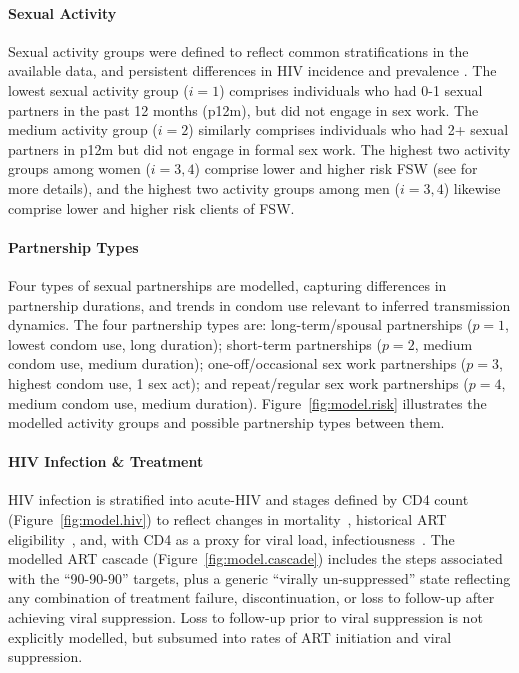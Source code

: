 \paragraph{Sexual Activity}
Sexual activity groups were defined to reflect common stratifications in the available data,
and persistent differences in HIV incidence and prevalence
\cite{SDHS2006,Bicego2013,Justman2016,SHIMS2}.
The lowest sexual activity group ($i=1$) comprises
individuals who had 0-1 sexual partners in the past 12 months (p12m),
but did not engage in sex work.
The medium activity group ($i=2$) similarly comprises
individuals who had 2+ sexual partners in p12m
but did not engage in formal sex work.
The highest two activity groups among women ($i=3,4$) comprise
lower and higher risk FSW (see  for more details), and
the highest two activity groups among men ($i=3,4$) likewise comprise
lower and higher risk clients of FSW.
\paragraph{Partnership Types}
Four types of sexual partnerships are modelled,
capturing differences in partnership durations, and
trends in condom use relevant to inferred transmission dynamics.
The four partnership types are:
long-term/spousal partnerships ($p=1$, lowest condom use, long duration);
short-term partnerships ($p=2$, medium condom use, medium duration);
one-off/occasional sex work partnerships ($p=3$, highest condom use, 1 sex act);
and repeat/regular sex work partnerships ($p=4$, medium condom use, medium duration).
Figure~\ref{fig:model.risk} illustrates
the modelled activity groups and possible partnership types between them.
\paragraph{HIV Infection \& Treatment}
HIV infection is stratified into
acute-HIV and stages defined by CD4 count (Figure~\ref{fig:model.hiv})
to reflect changes in mortality~\cite{Mangal2017},
historical ART eligibility~\cite{EswMOH2006gui,EswMOH2010gui,EswMOH2015gui,EswMOH2018gui},
and, with CD4 as a proxy for viral load, infectiousness~\cite{Boily2009}.
The modelled ART cascade (Figure~\ref{fig:model.cascade})
includes the steps associated with the ``90-90-90'' targets,
plus a generic ``virally un-suppressed'' state reflecting any combination of
treatment failure, discontinuation, or loss to follow-up after achieving viral suppression.
Loss to follow-up prior to viral suppression is not explicitly modelled,
but subsumed into rates of ART initiation and viral suppression.
